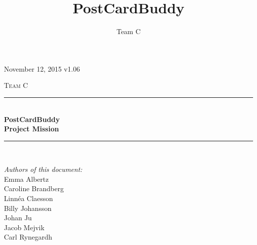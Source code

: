\documentclass[10pt,a4paper]{article}
\title{PostCardBuddy}
\author{Team C}
\begin{document}
\begin{titlepage}
\newcommand{\HRule}{\rule{\linewidth}{0.5mm}}


\begin{flushright}
November 12, 2015 v1.06\\[3cm]
\end{flushright}


\centering
\textsc{\LARGE Team C}\\[0.5cm]

\HRule \\[0.4cm]
{ \huge \bfseries PostCardBuddy}\\[0.3cm]
{\Large \bfseries Project Mission}\\[0.4cm] %
\HRule \\[1.5cm]

\vfill
\begin{flushleft}
\textit{Authors of this document:}\\
Emma Albertz\\
Caroline Brandberg\\
Linnéa Claesson\\
Billy Johansson\\
Johan Ju\\
Jacob Mejvik\\
Carl Rynegardh
\end{flushleft}

\end{titlepage}



%



\setcounter{tocdepth}{2}
\tableofcontents
\newpage
{}




\end{document}

